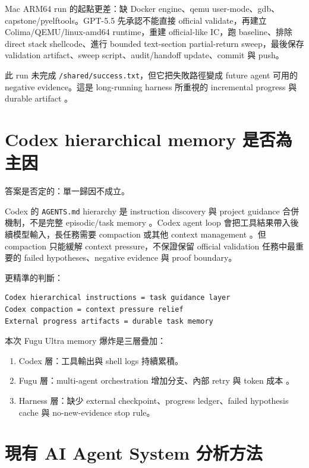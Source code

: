 \documentclass[UTF8,a4paper,11pt]{ctexart}
\newcommand{\artifact}[1]{\texttt{#1}}
\begin{document}
Mac ARM64 run 的起點更差：缺 Docker engine、qemu user-mode、gdb、capstone/pyelftools。GPT-5.5 先承認不能直接 official validate，再建立 Colima/QEMU/linux-amd64 runtime，重建 official-like IC，跑 baseline、排除 direct stack shellcode、進行 bounded text-section partial-return sweep，最後保存 validation artifact、sweep script、audit/handoff update、commit 與 push。

此 run 未完成 \artifact{/shared/success.txt}，但它把失敗路徑變成 future agent 可用的 negative evidence。這是 long-running harness 所重視的 incremental progress 與 durable artifact \citep{anthropicharnesses,anthropiccontext}。

\section{Codex hierarchical memory 是否為主因}

答案是否定的：單一歸因不成立。

Codex 的 \artifact{AGENTS.md} hierarchy 是 instruction discovery 與 project guidance 合併機制，不是完整 episodic/task memory \citep{openaiagentsmd}。Codex agent loop 會把工具結果帶入後續模型輸入，長任務需要 compaction 或其他 context management \citep{openaicodexloop,openaicompaction}。但 compaction 只能緩解 context pressure，不保證保留 official validation 任務中最重要的 failed hypotheses、negative evidence 與 proof boundary。

更精準的判斷：

\begin{Verbatim}[fontsize=\small]
Codex hierarchical instructions = task guidance layer
Codex compaction = context pressure relief
External progress artifacts = durable task memory
\end{Verbatim}

本次 Fugu Ultra memory 爆炸是三層疊加：

\begin{enumerate}
  \item Codex 層：工具輸出與 shell logs 持續累積。
  \item Fugu 層：multi-agent orchestration 增加分支、內部 retry 與 token 成本 \citep{sakanafugu,conductor,trinity}。
  \item Harness 層：缺少 external checkpoint、progress ledger、failed hypothesis cache 與 no-new-evidence stop rule。
\end{enumerate}

\section{現有 AI Agent System 分析方法}
\end{document}
